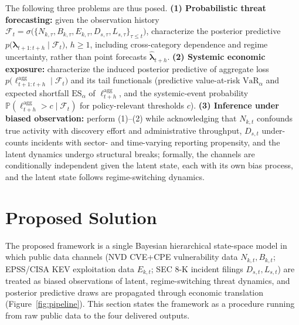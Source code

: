 \documentclass[review]{elsarticle}
\newcommand{\Prob}{\mathbb{P}}
\begin{document}
The following three problems are thus posed. \textbf{(1) Probabilistic threat forecasting:} given the observation history $\mathcal{F}_t = \sigma\big(\{N_{k,\tau}, B_{k,\tau}, E_{k,\tau}, D_{s,\tau}, L_{s,\tau}\}_{\tau \le t}\big)$, characterize the posterior predictive $p\big(\bm{\lambda}_{t+1:t+h} \mid \mathcal{F}_t\big)$, $h \geq 1$, including cross-category dependence and regime uncertainty, rather than point forecasts $\hat{\bm{\lambda}}_{t+h}$. \textbf{(2) Systemic economic exposure:} characterize the induced posterior predictive of aggregate loss $p\big(\ell^{\mathrm{agg}}_{t+1:t+h} \mid \mathcal{F}_t\big)$ and its tail functionals (predictive value-at-risk $\mathrm{VaR}_{\alpha}$ and expected shortfall $\mathrm{ES}_{\alpha}$ of $\ell^{\mathrm{agg}}_{t+h}$, and the systemic-event probability $\Prob(\ell^{\mathrm{agg}}_{t+h} > c \mid \mathcal{F}_t)$ for policy-relevant thresholds $c$). \textbf{(3) Inference under biased observation:} perform (1)--(2) while acknowledging that $N_{k,t}$ confounds true activity with discovery effort and administrative throughput, $D_{s,t}$ under-counts incidents with sector- and time-varying reporting propensity, and the latent dynamics undergo structural breaks; formally, the channels are conditionally independent given the latent state, each with its own bias process, and the latent state follows regime-switching dynamics.


\section{Proposed Solution}\label{sec:solution}
The proposed framework is a single Bayesian hierarchical state-space model in which public data channels (NVD CVE+CPE vulnerability data $N_{k,t}, B_{k,t}$; EPSS/CISA KEV exploitation data $E_{k,t}$; SEC 8-K incident filings $D_{s,t}, L_{s,t}$) are treated as biased observations of latent, regime-switching threat dynamics, and posterior predictive draws are propagated through economic translation (Figure~\ref{fig:pipeline}). This section states the framework as a procedure running from raw public data to the four delivered outputs.
\end{document}
